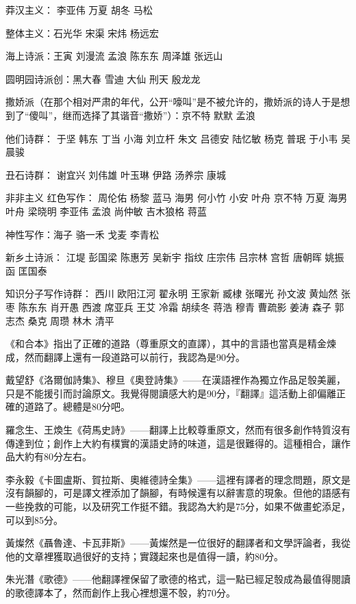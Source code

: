 \documentclass[UTF8]{../../RepresentationUniverse}
\begin{document}
莽汉主义： 李亚伟 万夏 胡冬 马松

整体主义：石光华 宋渠 宋炜 杨远宏

海上诗派：王寅 刘漫流 孟浪 陈东东 周泽雄 张远山

圆明园诗派创：黑大春 雪迪 大仙 刑天 殷龙龙


撒娇派（在那个相对严肃的年代，公开“嚎叫”是不被允许的，撒娇派的诗人于是想到了“傻叫”，继而选择了其谐音“撒娇”）：京不特 默默 孟浪

他们诗群： 于坚 韩东 丁当 小海 刘立杆 朱文 吕德安 陆忆敏 杨克 普珉 于小韦 吴晨骏


丑石诗群： 谢宜兴 刘伟雄 叶玉琳 伊路 汤养宗 康城


非非主义 红色写作： 周伦佑 杨黎 蓝马 海男 何小竹 小安 叶舟 京不特 万夏 海男 叶舟 梁晓明 李亚伟 孟浪 尚仲敏 吉木狼格 蒋蓝


神性写作：海子 骆一禾 戈麦 李青松

新乡土诗派： 江堤 彭国梁 陈惠芳 吴新宇 指纹 庄宗伟 吕宗林 宫哲 唐朝晖 姚振函 匡国泰


知识分子写作诗群： 西川 欧阳江河 翟永明 王家新 臧棣 张曙光 孙文波 黄灿然 张枣 陈东东 肖开愚 西渡 席亚兵 王艾 冷霜 胡续冬 蒋浩 穆青 曹疏影 姜涛 森子 郭志杰 桑克 周瓒 林木 清平

 









《和合本》指出了正確的道路（尊重原文的直譯），其中的言語也當真是精金煉成，然而翻譯上還有一段道路可以前行，我認為是90分。


戴望舒《洛爾伽詩集》、穆旦《奧登詩集》——在漢語裡作為獨立作品足彀美麗，只是不能援引而討論原文。我覺得閱讀感大約是90分，『翻譯』這活動上卻偏離正確的道路了。總體是80分吧。


羅念生、王煥生《荷馬史詩》——翻譯上比較尊重原文，然而有很多創作特質沒有傳達到位；創作上大約有樸實的漢語史詩的味道，這是很難得的。這種相合，讓作品大約有80分左右。


李永毅《卡圖盧斯、賀拉斯、奧維德詩全集》——這裡有譯者的理念問題，原文是沒有韻腳的，可是譯文裡添加了韻腳，有時候還有以辭害意的現象。但他的語感有一些挽救的可能，以及研究工作挺不錯。我認為大約是75分，如果不做畫蛇添足，可以到85分。


黃燦然《聶魯達、卡瓦菲斯》——黃燦然是一位很好的翻譯者和文學評論者，我從他的文章裡獲取過很好的支持；實踐起來也是值得一讀，約80分。


朱光潛《歌德》——他翻譯裡保留了歌德的格式，這一點已經足彀成為最值得閱讀的歌德譯本了，然而創作上我心裡想還不彀，約70分。
\end{document}

